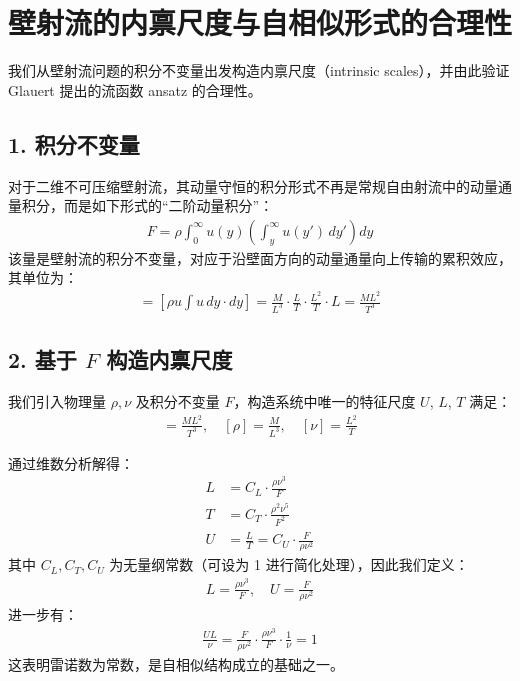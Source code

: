 \section*{壁射流的内禀尺度与自相似形式的合理性}

我们从壁射流问题的积分不变量出发构造内禀尺度（intrinsic scales），并由此验证 Glauert 提出的流函数 ansatz 的合理性。

\subsection*{1. 积分不变量}

对于二维不可压缩壁射流，其动量守恒的积分形式不再是常规自由射流中的动量通量积分，而是如下形式的“二阶动量积分”：
\begin{align}
    F = \rho \int_0^\infty u(y) \left( \int_y^\infty u(y') \, dy' \right) dy
\end{align}
该量是壁射流的积分不变量，对应于沿壁面方向的动量通量向上传输的累积效应，其单位为：
\begin{align}
    [F] = \left[ \rho u \int u \, dy \cdot dy \right] = \frac{M}{L^3} \cdot \frac{L}{T} \cdot \frac{L^2}{T} \cdot L = \frac{ML^2}{T^3}
\end{align}

\subsection*{2. 基于 $F$ 构造内禀尺度}

我们引入物理量 $\rho, \nu$ 及积分不变量 $F$，构造系统中唯一的特征尺度 $U$, $L$, $T$ 满足：
\begin{align}
    [F] = \frac{ML^2}{T^3}, \quad [\rho] = \frac{M}{L^3}, \quad [\nu] = \frac{L^2}{T}
\end{align}

通过维数分析解得：
\begin{align}
    L &= C_L \cdot \frac{\rho \nu^3}{F} \\
    T &= C_T \cdot \frac{\rho^2 \nu^5}{F^2} \\
    U &= \frac{L}{T} = C_U \cdot \frac{F}{\rho \nu^2}
\end{align}
其中 $C_L, C_T, C_U$ 为无量纲常数（可设为 1 进行简化处理），因此我们定义：
\begin{align}
    L = \frac{\rho \nu^3}{F}, \quad U = \frac{F}{\rho \nu^2}
\end{align}
进一步有：
\begin{align}
    \frac{UL}{\nu} = \frac{F}{\rho \nu^2} \cdot \frac{\rho \nu^3}{F} \cdot \frac{1}{\nu} = 1
\end{align}
这表明雷诺数为常数，是自相似结构成立的基础之一。

